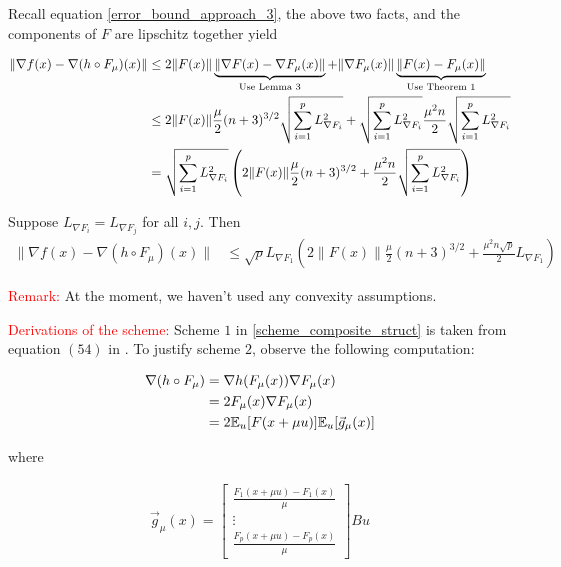 \documentclass{article}
\begin{document}
Recall equation \eqref{error_bound_approach_3}, the above two facts, and the components of $F$ are lipschitz together yield

\begin{align}
\| \nabla f(x) - \nabla (h \circ F_{\mu})(x)\| & \leq 2\|F(x)\| \underbrace{\|\nabla F(x) - \nabla F_{\mu}(x)\|}_{\text{Use Lemma } 3} + \|\nabla F_{\mu}(x)\| \underbrace{\|F(x) - F_{\mu}(x)\|}_{\text{Use Theorem } 1} \notag \\ & \leq 2\|F(x)\| \frac{\mu}{2}(n+3)^{3/2}\sqrt{\sum_{i=1}^p L_{\nabla F_i}^2} + \sqrt{\sum_{i=1}^pL_{\nabla F_i}^2} \frac{\mu^2n}{2}\sqrt{\sum_{i=1}^pL_{\nabla F_i}^2} \notag \\ & = \sqrt{\sum_{i=1}^pL_{\nabla F_i}^2}\left(2\|F(x)\|\frac{\mu}{2}(n+3)^{3/2} + \frac{\mu^2n}{2}\sqrt{\sum_{i=1}^pL_{\nabla F_i}^2}\right)
\end{align}

Suppose $L_{\nabla F_i} = L_{\nabla F_j}$ for all $i,j$. Then 
\begin{align}
\| \nabla f(x) - \nabla (h \circ F_{\mu})(x)\|  & \leq \sqrt{p}L_{\nabla F_1}\left(2\|F(x)\|\frac{\mu}{2}(n+3)^{3/2} + \frac{\mu^2n\sqrt{p}}{2}L_{\nabla F_1}\right)
\end{align}

\textcolor{red}{Remark:} At the moment, we haven't used any convexity assumptions. \newline 

\textcolor{red}{Derivations of the scheme:} Scheme $1$ in \ref{scheme_composite_struct} is taken from equation $(54)$ in \cite{Nesterov2015}. To justify scheme $2$, observe the following computation:

\begin{align}
\nabla (h \circ F_{\mu}) & = \nabla h(F_{\mu}(x)) \nabla F_{\mu}(x) \notag \\ & = 2F_{\mu}(x)\nabla F_{\mu}(x) \notag \\ & = 2\mathbb{E}_u[F(x+\mu u)] \mathbb{E}_u[\vec{g}_{\mu}(x)] \label{h_compose_F_mu_grad}
\end{align}

where 

\begin{align}
\vec{g}_{\mu}(x) = \begin{bmatrix}
\frac{F_1(x+\mu u) - F_1(x)}{\mu} \\ \vdots \\ \frac{F_p(x+\mu u) - F_p(x)}{\mu}
\end{bmatrix}Bu
\end{align}
\end{document}
